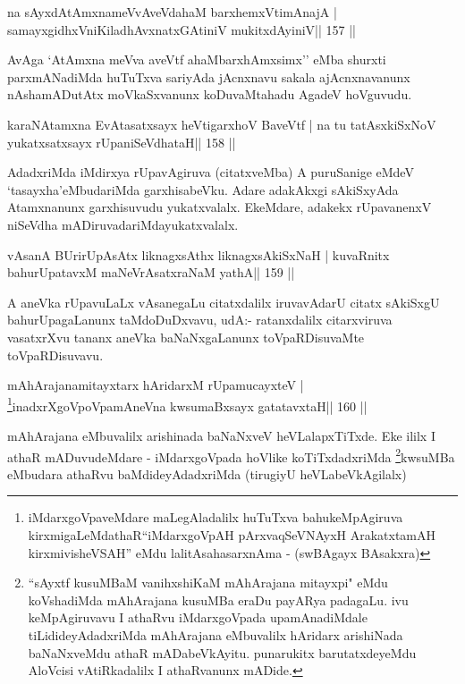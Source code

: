 \begin{shl}
na sAyxdAtAmxnameVvAveVdahaM barxhemxVtimAnajA |
samayxgidhxVniKiladhAvxnatxGAtiniV mukitxdAyiniV\hfill || 157 ||
\end{shl}

\begin{artha}
AvAga `AtAmxna meVva aveVtf ahaMbarxhAmxsimx'' eMba shurxti parxmANadiMda huTuTxva sariyAda jAcnxnavu sakala ajAcnxnavanunx nAshamADutAtx moVkaSxvanunx koDuvaMtahadu AgadeV hoVguvudu.
\end{artha}

\begin{shl}
karaNAtamxna EvAtasatxsayx heVtigarxhoV BaveVtf |
na tu tatAsxkiSxNoV yukatxsatxsayx rUpaniSeVdhataH\hfill || 158 ||
\end{shl}

\begin{artha}
AdadxriMda iMdirxya rUpavAgiruva (citatxveMba) A puruSanige eMdeV `tasayxha'eMbudariMda garxhisabeVku. Adare adakAkxgi sAkiSxyAda Atamxnanunx garxhisuvudu yukatxvalalx. EkeMdare, adakekx rUpavanenxV niSeVdha mADiruvadariMda\break yukatxvalalx.
\end{artha}


\begin{shl}
vAsanA BUrirUpAsAtx liknagxsAthx liknagxsAkiSxNaH |
kuvaRnitx bahurUpatavxM maNeVrAsatxraNaM yathA\hfill || 159 ||
\end{shl}

\begin{artha}
A aneVka rUpavuLaLx vAsanegaLu citatxdalilx iruvavAdarU citatx sAkiSxgU bahurUpagaLanunx taMdoDuDxvavu, udA:- ratanxdalilx citarxviruva vasatxrXvu tananx aneVka baNaNxgaLanunx toVpaRDisuvaMte toVpaRDisuvavu.
\end{artha}

\begin{shl}
mAhArajanamitayxtarx hAridarxM rUpamucayxteV |
\footnote{iMdarxgoVpaveMdare maLegAladalilx huTuTxva bahukeMpAgiruva kirxmigaLeMdathaR\break ``iMdarxgoVpAH pArxvaqSeVNAyxH ArakatxtamAH kirxmivisheVSAH'' eMdu lalitAsahasarxnAma - (swBAgayx BAsakxra)}inadxrXgoVpoVpamAneVna kwsumaBxsayx gatatavxtaH\hfill || 160 ||
\end{shl}

\begin{artha}
mAhArajana eMbuvalilx arishinada baNaNxveV heVLalapxTiTxde. Eke ililx
I athaR mADuvudeMdare - iMdarxgoVpada hoVlike
koTiTxdadxriMda \footnote{``sAyxtf kusuMBaM vanihxshiKaM mAhArajana
mitayxpi" eMdu koVshadiMda mAhArajana kusuMBa eraDu payARya
padagaLu. ivu keMpAgiruvavu I athaRvu iMdarxgoVpada upamAnadiMdale
tiLidideyAdadxriMda mAhArajana eMbuvalilx hAridarx arishiNada
baNaNxveMdu athaR mADabeVkAyitu. punarukitx barutatxdeyeMdu AloVcisi
vAtiRkadalilx I athaRvanunx mADide.}kwsuMBa eMbudara athaRvu
baMdideyAdadxriMda (tirugiyU heVLabeVkAgilalx)
\end{artha}

